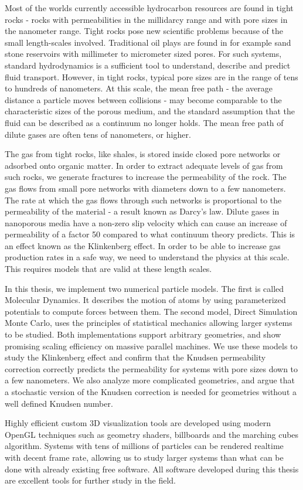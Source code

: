 Most of the worlds currently accessible hydrocarbon resources are found in tight rocks - rocks with permeabilities in the millidarcy range and with pore sizes in the nanometer range. Tight rocks pose new scientific problems because of the small length-scales involved. Traditional oil plays are found in for example sand stone reservoirs with millimeter to micrometer sized pores. For such systems, standard hydrodynamics is a sufficient tool to understand, describe and predict fluid transport. However, in tight rocks, typical pore sizes are in the range of tens to hundreds of nanometers. At this scale, the mean free path - the average distance a particle moves between collisions - may become comparable to the characteristic sizes of the porous medium, and the standard assumption that the fluid can be described as a continuum no longer holds. The mean free path of dilute gases are often tens of nanometers, or higher. 

The gas from tight rocks, like shales, is stored inside closed pore networks or adsorbed onto organic matter. In order to extract adequate levels of gas from such rocks, we generate fractures to increase the permeability of the rock. The gas flows from small pore networks with diameters down to a few nanometers. The rate at which the gas flows through such networks is proportional to the permeability of the material - a result known as Darcy's law. Dilute gases in nanoporous media have a non-zero slip velocity which can cause an increase of permeability of a factor 50 compared to what continuum theory predicts. This is an effect known as the Klinkenberg effect. In order to be able to increase gas production rates in a safe way, we need to understand the physics at this scale. This requires models that are valid at these length scales.

In this thesis, we implement two numerical particle models. The first is called Molecular Dynamics. It describes the motion of atoms by using parameterized potentials to compute forces between them. The second model, Direct Simulation Monte Carlo, uses the principles of statistical mechanics allowing larger systems to be studied. Both implementations support arbitrary geometries, and show promising scaling efficiency on massive parallel machines. We use these models to study the Klinkenberg effect and confirm that the Knudsen permeability correction correctly predicts the permeability for systems with pore sizes down to a few nanometers. We also analyze more complicated geometries, and argue that a stochastic version of the Knudsen correction is needed for geometries without a well defined Knudsen number. 

Highly efficient custom 3D visualization tools are developed using modern OpenGL techniques such as geometry shaders, billboards and the marching cubes algorithm. Systems with tens of millions of particles can be rendered realtime with decent frame rate, allowing us to study larger systems than what can be done with already existing free software. All software developed during this thesis are excellent tools for further study in the field.